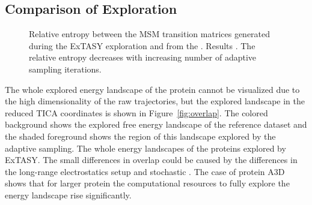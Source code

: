\subsection{\label{sec:time-fold}Comparison of Exploration}
\begin{figure}[H]
   
   \begin{subfigure}[b]{0.7\linewidth}
   {}
   \end{subfigure}%
   
  \caption{
  Relative entropy between the MSM transition matrices generated during the
  ExTASY exploration and from the . Results . The relative entropy decreases with increasing number of adaptive
  sampling iterations. }
  \label{fig:rel_ent}
\end{figure}

The whole explored energy landscape of the protein cannot be visualized due to
the high dimensionality of the raw trajectories, but the explored landscape in
the reduced TICA coordinates is shown in
Figure~\ref{fig:overlap}. The colored background shows the explored free energy landscape of
the reference dataset and the shaded foreground shows the region of this landscape explored
by the adaptive sampling. The whole energy landscapes of the proteins explored by ExTASY. The small differences in overlap could be
caused by the differences in the long-range electrostatics setup and stochastic . The case of protein A3D shows that for larger protein the computational resources to fully explore the energy landscape rise significantly. 

